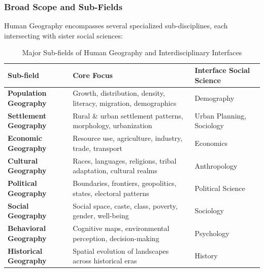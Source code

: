 \documentclass[11pt,a4paper]{article}
\begin{document}
\subsubsection{Broad Scope and Sub-Fields}
Human Geography encompasses several specialized sub-disciplines, each intersecting with sister social sciences:
\begin{table}[h!]
\centering
\small
\begin{tabularx}{\textwidth}{l X X}
\toprule
\textbf{Sub-field} & \textbf{Core Focus} & \textbf{Interface Social Science} \\
\midrule
\textbf{Population Geography} & Growth, distribution, density, literacy, migration, demographics & Demography \\
\textbf{Settlement Geography} & Rural \& urban settlement patterns, morphology, urbanization & Urban Planning, Sociology \\
\textbf{Economic Geography} & Resource use, agriculture, industry, trade, transport & Economics \\
\textbf{Cultural Geography} & Races, languages, religions, tribal adaptation, cultural realms & Anthropology \\
\textbf{Political Geography} & Boundaries, frontiers, geopolitics, states, electoral patterns & Political Science \\
\textbf{Social Geography} & Social space, caste, class, poverty, gender, well-being & Sociology \\
\textbf{Behavioral Geography} & Cognitive maps, environmental perception, decision-making & Psychology \\
\textbf{Historical Geography} & Spatial evolution of landscapes across historical eras & History \\
\bottomrule
\end{tabularx}
\caption{Major Sub-fields of Human Geography and Interdisciplinary Interfaces}
\end{table}
\end{document}
